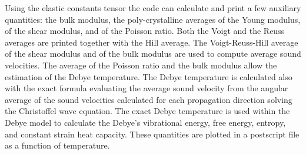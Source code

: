 \documentclass[12pt,a4paper,twoside]{report}
\begin{document}
Using the elastic constants tensor the code can calculate and print
a few auxiliary quantities:
the bulk modulus, the poly-crystalline averages of the Young modulus,
of the shear modulus, and of the Poisson ratio. Both the Voigt and the
Reuss averages are printed together with the Hill average.
The Voigt-Reuss-Hill average of the shear modulus and of the bulk modulus are 
used to compute average sound velocities. The average of the Poisson ratio and
the bulk modulus allow the estimation of the Debye 
temperature. The Debye temperature is calculated also with the exact 
formula evaluating the average sound 
velocity from the angular average of the sound velocities calculated 
for each propagation direction solving the Christoffel wave equation.
The exact Debye temperature is used within the Debye model to calculate the
Debye's vibrational energy, free energy, entropy, and constant strain heat
capacity. These quantities are plotted in a postscript file as a function
of temperature.


%
\end{document}
